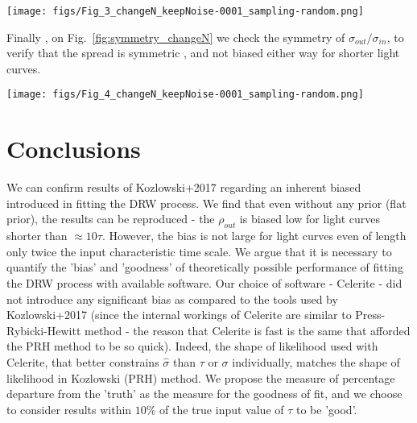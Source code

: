\documentclass[fleqn,usenatbib]{mnras}  %
\begin{document}
\begin{figure*}
\texttt{[image: figs/Fig\_3\_changeN\_keepNoise-0001\_sampling-random.png]}
\caption{Histogram of the fractional bias of $\rho_{out}-\rho_{in} / \rho_{in}$, as a function of the input $\rho$ (=575 / N). From left to right we change N from 1000 to 60 which sets the maximum value of $\rho_{in}$. We fix photometric noise at 0.001 mag level and select random sampling. Overplotted is the median fractional bias (orange dots), the unbiased level (horizontal dotted line), and the value of $\rho_{in} = 0.1$ (vertical solid line). Note that regardless of the number of points sampling the lightcurve, the bias is less than 25\%  as long as  the length of light curve is at least ten times longer than the true decorrelation timescale ($\tau = 575 $days ).}
\label{fig:fracbias_changeN}
\end{figure*} 

Finally , on Fig.~\ref{fig:symmetry_changeN} we check the symmetry of $\sigma_{out} / \sigma_{in}$, to verify that the spread is symmetric , and not biased either way for shorter light curves. 


\begin{figure*}
\texttt{[image: figs/Fig\_4\_changeN\_keepNoise-0001\_sampling-random.png]}
\caption{Histogram of the 'measured' $\sigma_{out}$ to 'true' $\sigma_{in}$. As in Fig.~\ref{fig:fracbias_changeN}, we change the N points from left to right, keeping the sampling type (random) and photometric error (0.001 mag) unchanged. The orange circles mark the median y. We also overplot the horizontal dotted line at y=0, and vertical solid line at x=-1.0.}
\label{fig:symmetry_changeN}
\end{figure*} 


\section{Conclusions}

We can confirm results of Kozlowski+2017 regarding an inherent biased introduced in fitting the DRW process. We find that even without any prior (flat prior), the results can be reproduced - the $\rho_{out}$ is biased low for light curves shorter than $\approx 10 \tau$.  However,  the bias is not large for light curves even of length only twice the input characteristic time scale. We argue that it is necessary to quantify the 'bias' and 'goodness' of  theoretically possible performance of  fitting the DRW process with available software. Our choice of software - Celerite - did not introduce any significant bias as compared to the tools used by Kozlowski+2017 (since the internal workings of Celerite are similar to Press-Rybicki-Hewitt method - the reason that Celerite is fast is the same that afforded the PRH method to be so quick). Indeed, the shape of likelihood used with Celerite, that better constrains $\hat{\sigma}$ than $\tau$ or $\sigma$  individually, matches the shape of likelihood in Kozlowski (PRH) method.  We propose the measure of percentage departure from the 'truth' as the measure for the goodness of fit,  and we choose  to consider results within $10 \%$ of the true input value of $\tau$ to be 'good'. 
\end{document}

